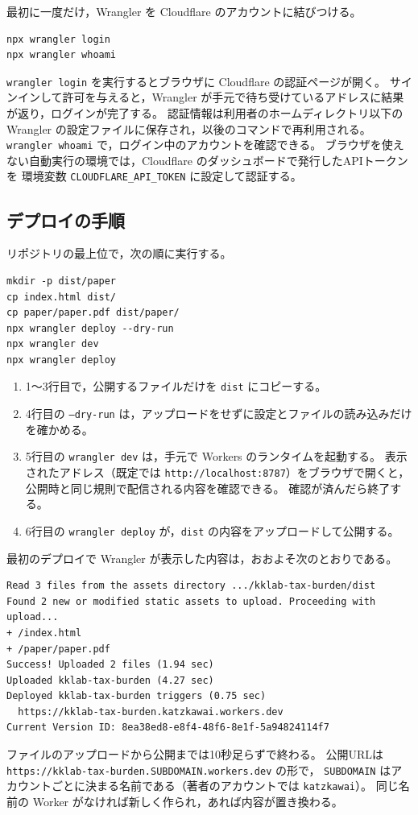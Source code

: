 \documentclass[paper=a4,fontsize=10pt]{jlreq}
\newcommand{\code}[1]{\texttt{#1}}
\begin{document}
最初に一度だけ，Wrangler を Cloudflare のアカウントに結びつける。

\medskip
\noindent
\begin{minipage}{\linewidth}
\begin{lstlisting}
npx wrangler login
npx wrangler whoami
\end{lstlisting}
\end{minipage}
\medskip

\code{wrangler login} を実行するとブラウザに Cloudflare の認証ページが開く。
サインインして許可を与えると，Wrangler が手元で待ち受けているアドレスに結果が返り，ログインが完了する。
認証情報は利用者のホームディレクトリ以下の Wrangler の設定ファイルに保存され，以後のコマンドで再利用される。
\code{wrangler whoami} で，ログイン中のアカウントを確認できる。
ブラウザを使えない自動実行の環境では，Cloudflare のダッシュボードで発行したAPIトークンを
環境変数 \code{CLOUDFLARE\_API\_TOKEN} に設定して認証する。

\subsection{デプロイの手順}

リポジトリの最上位で，次の順に実行する。
\begin{lstlisting}
mkdir -p dist/paper
cp index.html dist/
cp paper/paper.pdf dist/paper/
npx wrangler deploy --dry-run
npx wrangler dev
npx wrangler deploy
\end{lstlisting}
\begin{enumerate}
  \item 1〜3行目で，公開するファイルだけを \code{dist} にコピーする。
  \item 4行目の \code{--dry-run} は，アップロードをせずに設定とファイルの読み込みだけを確かめる。
  \item 5行目の \code{wrangler dev} は，手元で Workers のランタイムを起動する。
    表示されたアドレス（既定では \code{http://localhost:8787}）をブラウザで開くと，公開時と同じ規則で配信される内容を確認できる。
    確認が済んだら終了する。
  \item 6行目の \code{wrangler deploy} が，\code{dist} の内容をアップロードして公開する。
\end{enumerate}
最初のデプロイで Wrangler が表示した内容は，おおよそ次のとおりである。
\begin{lstlisting}
Read 3 files from the assets directory .../kklab-tax-burden/dist
Found 2 new or modified static assets to upload. Proceeding with upload...
+ /index.html
+ /paper/paper.pdf
Success! Uploaded 2 files (1.94 sec)
Uploaded kklab-tax-burden (4.27 sec)
Deployed kklab-tax-burden triggers (0.75 sec)
  https://kklab-tax-burden.katzkawai.workers.dev
Current Version ID: 8ea38ed8-e8f4-48f6-8e1f-5a94824114f7
\end{lstlisting}
ファイルのアップロードから公開までは10秒足らずで終わる。
公開URLは \code{https://kklab-tax-burden.SUBDOMAIN.workers.dev} の形で，
\code{SUBDOMAIN} はアカウントごとに決まる名前である（著者のアカウントでは \code{katzkawai}）。
同じ名前の Worker がなければ新しく作られ，あれば内容が置き換わる。
\end{document}
